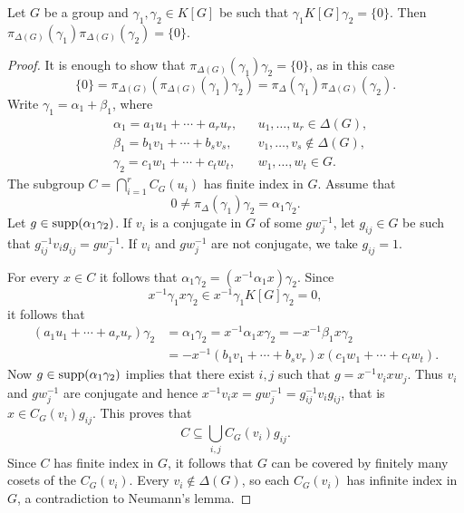 	

\begin{lemma}[Passman]
	\label{lem:Passman}
	Let $G$ be a group and 
	$\gamma_1,\gamma_2\in K[G]$ be such that $\gamma_1K[G]\gamma_2=\{0\}$.
	Then $\pi_{\Delta(G)}(\gamma_1)\pi_{\Delta(G)}(\gamma_2)=\{0\}$.
\end{lemma}

\begin{proof}
	It is enough to show that $\pi_{\Delta(G)}(\gamma_1)\gamma_2=\{0\}$, 
	as in this case
	\[
		\{0\}=\pi_{\Delta(G)}(\pi_{\Delta(G)}(\gamma_1)\gamma_2)=\pi_{\Delta}(\gamma_1)\pi_{\Delta(G)}(\gamma_2).
	\]
	Write $\gamma_1=\alpha_1+\beta_1$, where 
	\begin{align*}
		&\alpha_1=a_1u_1+\cdots+a_ru_r, && u_1,\dots,u_r\in\Delta(G),\\
		&\beta_1=b_1v_1+\cdots+b_sv_s, && v_1,\dots,v_s\not\in\Delta(G),\\
		&\gamma_2=c_1w_1+\cdots+c_tw_t,&& w_1,\dots,w_t\in G.
	\end{align*}
	The subgroup $C=\bigcap_{i=1}^rC_G(u_i)$ has finite index in $G$.
	Assume that 
	\[
		0\ne \pi_{\Delta}(\gamma_1)\gamma_2=\alpha_1\gamma_2. 
	\]
	Let $g\in\operatorname{supp}(\alpha_1\gamma_2)$. 
	If $v_i$ is a conjugate in $G$ of some 
	$gw_j^{-1}$, let $g_{ij}\in G$ be such that
	$g_{ij}^{-1}v_ig_{ij}=gw_j^{-1}$. If $v_i$ and $gw_j^{-1}$ 
	are not conjugate, 
	we take $g_{ij}=1$. 

	For every $x\in C$ it follows that
	$\alpha_1\gamma_2=(x^{-1}\alpha_1x)\gamma_2$. Since  
	\[
		x^{-1}\gamma_1x\gamma_2\in x^{-1}\gamma_1K[G]\gamma_2=0,
	\]
	it follows that
	\begin{align*}
		(a_1u_1+\cdots+a_ru_r)\gamma_2&=
		\alpha_1\gamma_2=x^{-1}\alpha_1x\gamma_2=-x^{-1}\beta_1x\gamma_2\\
		&=-x^{-1}(b_1v_1+\cdots+b_sv_r)x(c_1w_1+\cdots+c_tw_t).
	\end{align*}
	Now $g\in\operatorname{supp}(\alpha_1\gamma_2)$ implies that there exist $i,j$ such that
	$g=x^{-1}v_ixw_j$.
	Thus $v_i$ and $gw_j^{-1}$ are conjugate and hence
	$x^{-1}v_ix=gw_j^{-1}=g_{ij}^{-1}v_ig_{ij}$, that is
	$x\in C_G(v_i)g_{ij}$. This proves that 
	\[
		C\subseteq\bigcup_{i,j}C_G(v_i)g_{ij}. 
	\]
	Since $C$ has finite index in $G$, it follows that 
	$G$ can be covered by finitely many cosets of 
	the $C_G(v_i)$. Every $v_i\not\in\Delta(G)$, so 
	each $C_G(v_i)$ has infinite index in $G$, a contradiction 
	to Neumann's lemma.
\end{proof}


